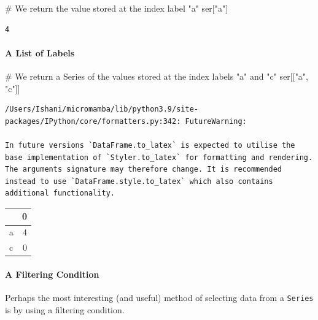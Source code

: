 \documentclass[
  letterpaper,
  DIV=11,
  numbers=noendperiod]{scrreprt}
\let\oldparagraph\paragraph
\renewcommand{\paragraph}[1]{\oldparagraph{#1}\mbox{}}
\newenvironment{Shaded}{\begin{snugshade}}{\end{snugshade}}
\newcommand{\CommentTok}[1]{\textcolor[rgb]{0.37,0.37,0.37}{#1}}
\newcommand{\NormalTok}[1]{\textcolor[rgb]{0.00,0.23,0.31}{#1}}
\newcommand{\StringTok}[1]{\textcolor[rgb]{0.13,0.47,0.30}{#1}}
\begin{document}
\begin{Shaded}
\begin{Highlighting}[]
\CommentTok{\# We return the value stored at the index label "a"}
\NormalTok{ser[}\StringTok{"a"}\NormalTok{] }
\end{Highlighting}
\end{Shaded}

\begin{verbatim}
4
\end{verbatim}

\hypertarget{a-list-of-labels}{%
\paragraph{A List of Labels}\label{a-list-of-labels}}

\begin{Shaded}
\begin{Highlighting}[]
\CommentTok{\# We return a Series of the values stored at the index labels "a" and "c"}
\NormalTok{ser[[}\StringTok{"a"}\NormalTok{, }\StringTok{"c"}\NormalTok{]] }
\end{Highlighting}
\end{Shaded}

\begin{verbatim}
/Users/Ishani/micromamba/lib/python3.9/site-packages/IPython/core/formatters.py:342: FutureWarning:

In future versions `DataFrame.to_latex` is expected to utilise the base implementation of `Styler.to_latex` for formatting and rendering. The arguments signature may therefore change. It is recommended instead to use `DataFrame.style.to_latex` which also contains additional functionality.
\end{verbatim}

\begin{tabular}{lr}
\toprule
{} &  0 \\
\midrule
a &  4 \\
c &  0 \\
\bottomrule
\end{tabular}

\hypertarget{a-filtering-condition}{%
\paragraph{A Filtering Condition}\label{a-filtering-condition}}

Perhaps the most interesting (and useful) method of selecting data from
a \texttt{Series} is by using a filtering condition.
\end{document}
